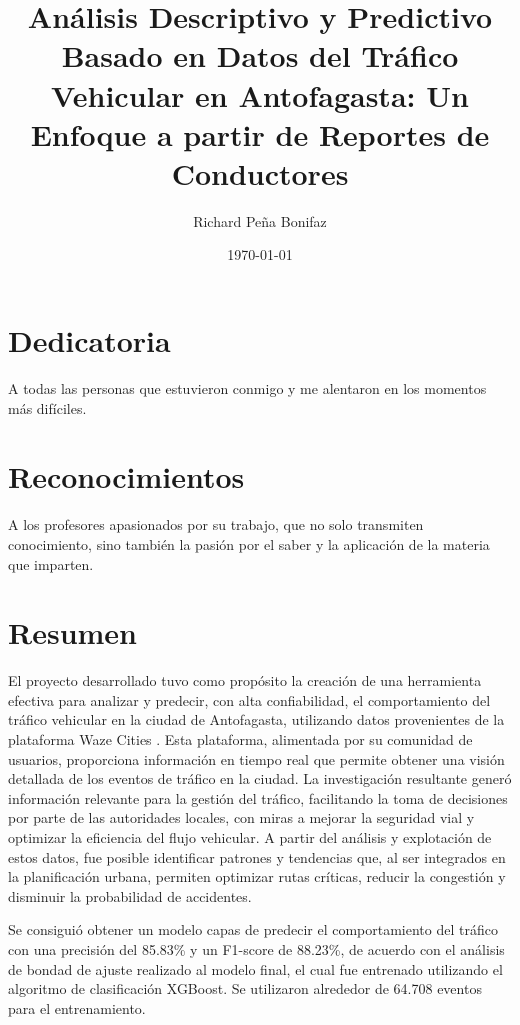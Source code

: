 \documentclass[12pt]{article}
\begin{document}
\title{Análisis Descriptivo y Predictivo Basado en Datos del Tráfico Vehicular en Antofagasta: Un Enfoque a partir de Reportes de Conductores}
\author{Richard Peña Bonifaz}
\date{\today}
\maketitle

\section*{Dedicatoria}

A todas las personas que estuvieron conmigo y me alentaron en los momentos más difíciles.

\section*{Reconocimientos}

A los profesores apasionados por su trabajo, que no solo transmiten conocimiento, sino también la pasión por el saber y la aplicación de la materia que imparten.

\newpage
\tableofcontents
\newpage

\section*{Resumen}

El proyecto desarrollado tuvo como propósito la creación de una herramienta efectiva para analizar y predecir, con alta confiabilidad, el comportamiento del tráfico vehicular en la ciudad de Antofagasta, utilizando datos provenientes de la plataforma Waze Cities \citep{wazecities2024}. Esta plataforma, alimentada por su comunidad de usuarios, proporciona información en tiempo real que permite obtener una visión detallada de los eventos de tráfico en la ciudad. La investigación resultante generó información relevante para la gestión del tráfico, facilitando la toma de decisiones por parte de las autoridades locales, con miras a mejorar la seguridad vial y optimizar la eficiencia del flujo vehicular. A partir del análisis y explotación de estos datos, fue posible identificar patrones y tendencias que, al ser integrados en la planificación urbana, permiten optimizar rutas críticas, reducir la congestión y disminuir la probabilidad de accidentes.

Se consiguió obtener un modelo capas de predecir el comportamiento del tráfico con una precisión del 85.83\% y un F1-score de 88.23\%, de acuerdo con el análisis de bondad de ajuste realizado al modelo final, el cual fue entrenado utilizando el algoritmo de clasificación XGBoost. Se utilizaron alrededor de 64.708 eventos para el entrenamiento.
\end{document}
